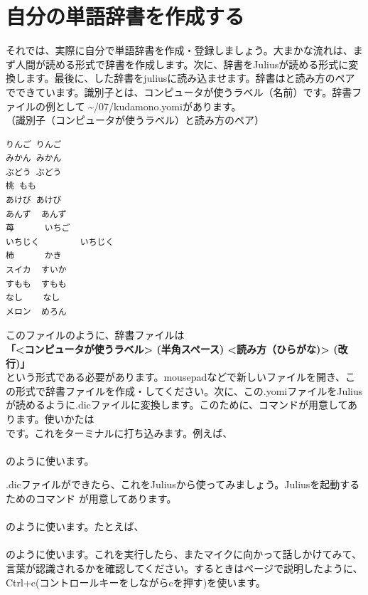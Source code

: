 \newpage
\section{自分の単語辞書を作成する}
それでは、実際に自分で単語辞書を作成・登録しましょう。大まかな流れは、まず人間が読める形式で辞書を作成します。次に、辞書をJuliusが読める形式に変換します。最後に、した辞書をjuliusに読み込ませます。辞書はと読み方のペアでできています。識別子とは、コンピュータが使うラベル（名前）です。辞書ファイルの例として \textasciitilde /07/kudamono.yomiがあります。\\

（識別子（コンピュータが使うラベル）と読み方のペア）


\begin{lstlisting}[caption=kudamino.yomi,label=kudamino.yomi]
りんご りんご
みかん みかん
ぶどう ぶどう
桃 もも
あけび あけび
あんず  あんず
苺      いちご
いちじく        いちじく
柿      かき
スイカ  すいか
すもも  すもも
なし    なし
メロン  めろん
\end{lstlisting}

このファイルのように、辞書ファイルは\\
\textbf{「<コンピュータが使うラベル> (半角スペース) <読み方（ひらがな)> (改行)」}\\
という形式である必要があります。mousepadなどで新しいファイルを開き、この形式で辞書ファイルを作成・してください。次に、この.yomiファイルをJuliusが読めるように.dicファイルに変換します。このために、コマンドが用意してあります。使いかたは\\
です。これをターミナルに打ち込みます。例えば、\\
\\
のように使います。

.dicファイルができたら、これをJuliusから使ってみましょう。Juliusを起動するためのコマンド  が用意してあります。\\
\\
のように使います。たとえば、\\
\\
のように使います。これを実行したら、またマイクに向かって話しかけてみて、言葉が認識されるかを確認してください。するときは\pageref{Julius}ページで説明したように、Ctrl+c(コントロールキーをしながらcを押す)を使います。

